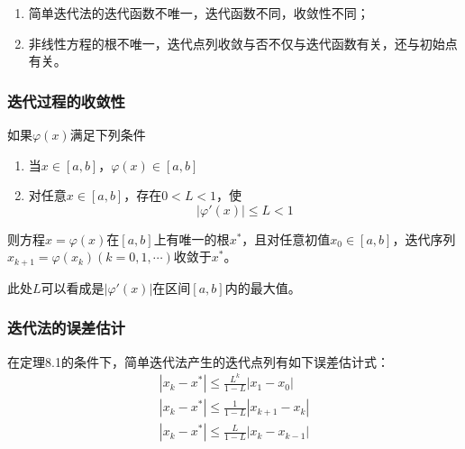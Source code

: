 \begin{remark}
    \begin{enumerate}
        \item 简单迭代法的迭代函数不唯一，迭代函数不同，收敛性不同；
        \item 非线性方程的根不唯一，迭代点列收敛与否不仅与迭代函数有关，还与初始点有关。
    \end{enumerate}
\end{remark}

\subsubsection{迭代过程的收敛性}
\begin{theorem}
    如果$\varphi(x)$满足下列条件
    \begin{enumerate}
        \item 当$x \in [a,b]$，$\varphi(x) \in [a,b]$
        \item 对任意$x \in [a,b]$，存在$0 < L < 1$，使
        \begin{equation*}
            |\varphi'(x)| \leq L < 1
        \end{equation*}
    \end{enumerate}
    则方程$x = \varphi(x)$在$[a,b]$上有唯一的根$x^*$，且对任意初值$x_0 \in [a,b]$，迭代序列$x_{k+1} = \varphi(x_k)(k =0,1,\cdots )$收敛于$x^*$。
    \begin{remark}
        此处$L$可以看成是$|\varphi'(x)|$在区间$[a,b]$内的最大值。
    \end{remark}
\end{theorem}

\subsubsection{迭代法的误差估计}
在定理8.1的条件下，简单迭代法产生的迭代点列有如下误差估计式：
\begin{align}
        |x_k-x^*| \leq \frac{L^k}{1-L}|x_1-x_0|\\
        |x_k-x^*| \leq \frac{1}{1-L}|x_{k+1}-x_k|\\
        |x_k-x^*| \leq \frac{L}{1-L}|x_k-x_{k-1}|
\end{align}

